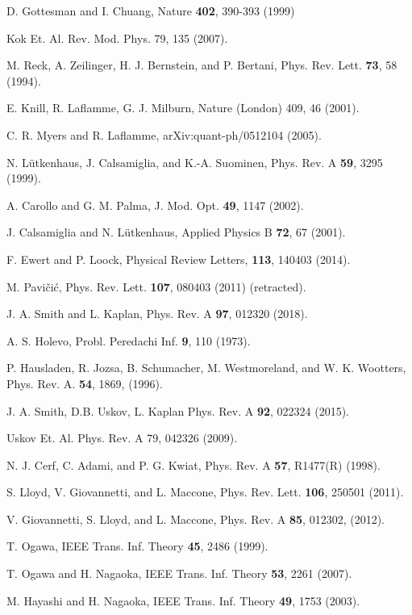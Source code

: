 \documentclass[aps,pra,twocolumn,showpacs,superscriptaddress,floatfix,10pt]{revtex4}
\begin{document}
\begin{thebibliography}{99}
	
 D. Gottesman and I. Chuang, Nature {\bf 402}, 390-393 (1999)

 Kok Et. Al.
Rev. Mod. Phys. 79, 135 (2007).

 M. Reck, A. Zeilinger, H. J. Bernstein, and P. Bertani, Phys. Rev. Lett. {\bf 73}, 58 (1994).

  E. Knill, R. Laflamme, G. J. Milburn, Nature (London) 409, 46 (2001).

 C. R. Myers and R. Laflamme, arXiv:quant-ph/0512104 (2005).

 N. L\"utkenhaus, J. Calsamiglia, and K.-A. Suominen, Phys. Rev. A {\bf 59}, 3295 (1999).

 A. Carollo and G. M. Palma, J. Mod. Opt. {\bf 49}, 1147 (2002).

 J. Calsamiglia and N. L\"utkenhaus, Applied Physics B {\bf 72}, 67 (2001).

 F. Ewert and P. Loock, Physical Review Letters, {\bf 113}, 140403 (2014).

 M. Pavi\v{c}i\'c, Phys. Rev. Lett. {\bf 107}, 080403 (2011) (retracted).

 J. A. Smith and L. Kaplan, Phys. Rev. A {\bf 97}, 012320 (2018).

 A. S. Holevo, Probl. Peredachi Inf. \textbf{9}, 110 (1973).	

 P. Hausladen, R. Jozsa, B. Schumacher, M. Westmoreland, and W. K. Wootters, Phys. Rev. A. \textbf{54}, 1869, (1996).

 J. A. Smith, D.B. Uskov, L. Kaplan Phys. Rev. A \textbf{92}, 022324 (2015).

 Uskov Et. Al.
Phys. Rev. A 79, 042326 (2009).

 N. J. Cerf, C. Adami, and P. G. Kwiat, Phys. Rev. A {\bf 57}, R1477(R) (1998).

 S. Lloyd, V. Giovannetti, and L. Maccone, Phys. Rev. Lett. \textbf{106}, 250501 (2011).

 V. Giovannetti, S. Lloyd, and L. Maccone, Phys. Rev. A \textbf{85}, 012302, (2012).

 T. Ogawa, IEEE Trans. Inf. Theory \textbf{45}, 2486 (1999).

 T. Ogawa and H. Nagaoka, IEEE Trans. Inf. Theory \textbf{53}, 2261 (2007).

 M. Hayashi and H. Nagaoka, IEEE Trans. Inf. Theory \textbf{49}, 1753 (2003).

\end{thebibliography}
\end{document}
